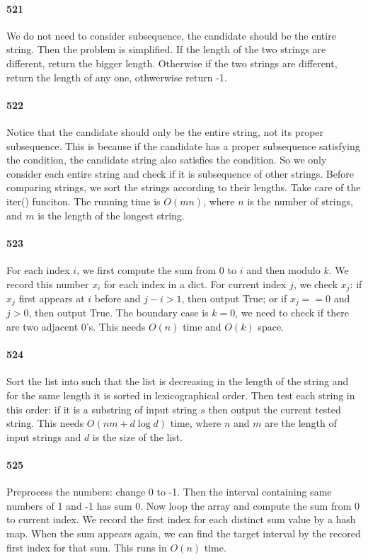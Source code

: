\documentclass[11pt]{article}
\begin{document}
\paragraph{521}
We do not need to consider subsequence, the candidate should be the entire string. Then the problem is simplified. If the length of the two strings are different, return the bigger length. Otherwise if the two strings are different, return 
the length of any one, othwerwise return -1. 

\paragraph{522}
Notice that the candidate should only be the entire string, not its proper subsequence.
This is because if the candidate has a proper subsequence satisfying the condition, the candidate string also satisfies the 
condition. So we only consider each entire string and check if it is subsequence of other strings. 
Before comparing strings, we sort the strings according to their lengths. Take care of the iter() funciton. 
The running time is $O(mn)$, where $n$ is the number of strings, and $m$ is the length of the longest string.



\paragraph{523}
For each index $i$, we first compute the sum from 0 to $i$ and then modulo $k$. We record this number $x_i$ for each index in a dict.
For current index $j$, we check $x_j$: if $x_j$ first appears at $i$ before and $j - i > 1$, then output True; or if $x_j == 0$ and $j > 0$, then output True.
The boundary case is $k = 0$, we need to check if there are two adjacent 0's.
This needs $O(n)$ time and $O(k)$ space.
 
\paragraph{524}
Sort the list into such that the list is decreasing in the length of the string and for the same length it is sorted in lexicographical order.
Then test each string in this order: if it is a substring of input string $s$ then output the current tested string.
This needs $O(nm + d \log d)$ time, where $n$ and $m$ are the length of input strings and $d$ is the size of the list.

\paragraph{525}
Preprocess the numbers: change 0 to -1.
Then the interval containing same numbers of 1 and -1 has sum 0.
Now loop the array and compute the sum from 0 to current index. 
We record the first index for each distinct sum value by a hash map.
When the sum appears again, we can find the target interval by the recored first index for that sum.
This runs in $O(n)$ time.
\end{document}
